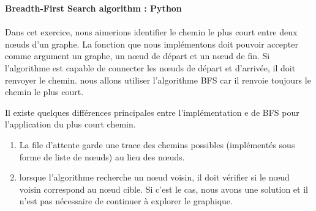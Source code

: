 \begin{Exercice}[15 minutes]\textbf{Breadth-First Search algorithm : Python
}\\
\\
	Dans cet exercice, nous aimerions identifier le chemin le plus court entre deux nœuds d'un graphe.
	La fonction que nous implémentons doit pouvoir accepter comme argument un graphe, un nœud de départ et un nœud de fin. Si l'algorithme est capable de connecter les nœuds 			de départ et d'arrivée, il doit renvoyer le chemin. nous allons utiliser l'algorithme BFS car il renvoie toujours le chemin le plus court.\\
	
    	\begin{conseil}
		Il existe quelques différences principales entre l'implémentation e de BFS pour l'application du plus court chemin.
        		\begin{enumerate}
			\item La file d'attente garde une trace des chemins possibles (implémentés sous forme de liste de nœuds) au lieu des nœuds.
	           	\item lorsque l'algorithme recherche un nœud voisin, il doit vérifier si le nœud voisin correspond au nœud cible. Si c'est le cas, nous avons une solution et il n'est pas 					nécessaire de continuer à explorer le graphique.
        		\end{enumerate}

    	\end{conseil}

	\begin{solution}
		
	\end{solution}
\end{Exercice}

